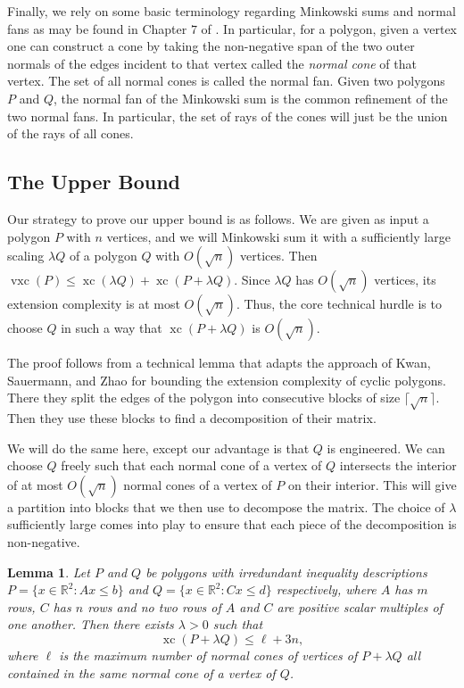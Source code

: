 \documentclass[centering,11pt,reqno]{amsart}
\newtheorem{lem}[theorem]{Lemma}
\theoremstyle{definition}
\DeclareMathOperator{\xc}{xc}
\DeclareMathOperator{\vxc}{vxc}
\newcommand{\defn}[1]{\emph{#1}}
\begin{document}
Finally, we rely on some basic terminology regarding Minkowski sums and normal fans as may be found in Chapter $7$ of \cite{LecturesonPolytopes}. In particular, for a polygon, given a vertex one can construct a cone by taking the non-negative span of the two outer normals of the edges incident to that vertex called the \defn{normal cone} of that vertex. The set of all normal cones is called the normal fan. Given two polygons $P$ and $Q$, the normal fan of the Minkowski sum is the common refinement of the two normal fans. In particular, the set of rays of the cones will just be the union of the rays of all cones. 






\subsection{The Upper Bound}

Our strategy to prove our upper bound is as follows. We are given as input a polygon $P$ with $n$ vertices, and we will Minkowski sum it with a sufficiently large scaling $\lambda Q$ of a polygon $Q$ with $O(\sqrt{n})$ vertices. Then $\vxc(P) \leq \xc(\lambda Q) + \xc(P+\lambda Q)$. Since $\lambda Q$ has $O(\sqrt{n})$ vertices, its extension complexity is at most $O(\sqrt{n})$. Thus, the core technical hurdle is to choose $Q$ in such a way that $\xc(P + \lambda Q)$ is $O(\sqrt{n})$.

The proof follows from a technical lemma that adapts the approach of Kwan, Sauermann, and Zhao for bounding the extension complexity of cyclic polygons. There they split the edges of the polygon into consecutive blocks of size $\lceil\sqrt{n}\rceil$. Then they use these blocks to find a decomposition of their matrix.

We will do the same here, except our advantage is that $Q$ is engineered. We can choose $Q$ freely such that each normal cone of a vertex of $Q$ intersects the interior of at most $O(\sqrt{n})$ normal cones of a vertex of $P$ on their interior. This will give a partition into blocks that we then use to decompose the matrix. The choice of $\lambda$ sufficiently large comes into play to ensure that each piece of the decomposition is non-negative. 

\begin{lem}
\label{lem:MinkSumBound}
Let $P$ and $Q$ be polygons with irredundant inequality descriptions $P= \{x \in \mathbb{R}^{2}: Ax \leq b\}$ and $Q = \{x \in \mathbb{R}^{2}: C x \leq d\}$ respectively, where $A$ has $m$ rows, $C$ has $n$ rows and no two rows of $A$ and $C$ are positive scalar multiples of one another. Then there exists $\lambda > 0$ such that
\[\xc(P+\lambda Q) \leq \ell + 3n,\]
where $\ell$ is the maximum number of normal cones of vertices of $P + \lambda Q$ all contained in the same normal cone of a vertex of $Q$. 
\end{lem}
\end{document}
